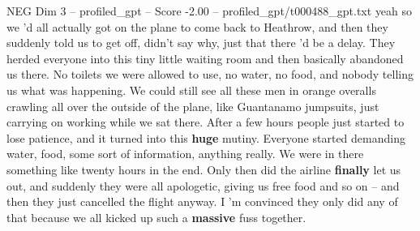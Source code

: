 \begin{textsample}{NEG Dim 3 – profiled\_gpt – Score -2.00 – profiled\_gpt/t000488\_gpt.txt}  \label{ex:f3_neg_021}
yeah so we ’d all actually got on the plane to come back to Heathrow, and then they suddenly told us to get off, didn't say why, just that there ’d be a delay.
They herded everyone into this tiny little waiting room and then basically abandoned us there.
No toilets we were allowed to use, no water, no food, and nobody telling us what was happening.
We could still see all these men in orange overalls crawling all over the outside of the plane, like Guantanamo jumpsuits, just carrying on working while we sat there.
After a few hours people just started to lose patience, and it turned into this \textbf{huge} mutiny.
Everyone started demanding water, food, some sort of information, anything really.
We were in there something like twenty hours in the end.
Only then did the airline \textbf{finally} let us out, and suddenly they were all apologetic, giving us free food and so on – and then they just cancelled the flight anyway.
I ’m convinced they only did any of that because we all kicked up such a \textbf{massive} fuss together.

\end{textsample}
